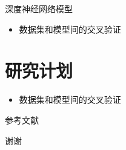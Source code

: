 \documentclass{beamer}
\begin{document}
\begin{frame}{深度神经网络模型}
    \begin{itemize}
        \item 数据集和模型间的交叉验证
    \end{itemize}
\end{frame}



\section{研究计划}

\begin{frame}
    \begin{itemize}
        \item 数据集和模型间的交叉验证
    \end{itemize}
\end{frame}


\begin{frame}[allowframebreaks]{参考文献}
	\printbibliography[heading=reference]
\end{frame}


\begin{frame}
    \begin{center}
        {\Huge\calligra 谢谢}
    \end{center}
\end{frame}
\end{document}
